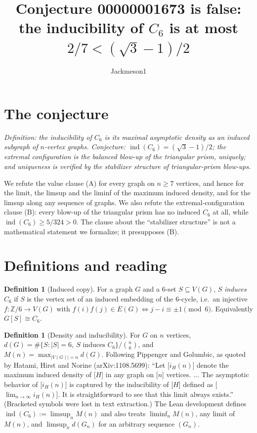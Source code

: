\documentclass[11pt]{article}
\title{Conjecture 00000001673 is false:\\ the inducibility of $C_6$ is at most $2/7 < (\sqrt3-1)/2$}
\author{Jackmeson1}
\date{}
\theoremstyle{definition}
\newtheorem{definition}[theorem]{Definition}
\newcommand{\ind}{\operatorname{ind}}
\begin{document}
\maketitle

\section*{The conjecture}
\emph{Definition: the inducibility of $C_6$ is its maximal asymptotic density as an induced subgraph
of $n$-vertex graphs. Conjecture: $\ind(C_6) = (\sqrt3-1)/2$; the extremal configuration is the
balanced blow-up of the triangular prism, uniquely; and uniqueness is verified by the stabilizer
structure of triangular-prism blow-ups.}

We refute the value clause (A) for every graph on $n \ge 7$ vertices, and hence for the limit,
the limsup and the liminf of the maximum induced density, and for the limsup along any sequence of
graphs. We also refute the extremal-configuration clause (B): every blow-up of the triangular prism
has no induced $C_6$ at all, while $\ind(C_6) \ge 5/324 > 0$. The clause about the ``stabilizer
structure'' is not a mathematical statement we formalize; it presupposes (B).

\section*{Definitions and reading}
\begin{definition}[Induced copy]
For a graph $G$ and a $6$-set $S \subseteq V(G)$, $S$ \emph{induces} $C_6$ if $S$ is the vertex set
of an induced embedding of the $6$-cycle, i.e.\ an injective $f\colon \mathbb{Z}/6 \to V(G)$ with
$f(i)f(j) \in E(G) \iff j-i \equiv \pm 1 \pmod 6$. Equivalently $G[S] \cong C_6$.
\end{definition}

\begin{definition}[Density and inducibility]
For $G$ on $n$ vertices, $d(G) = \#\{S : |S|=6,\ S \text{ induces } C_6\} / \binom{n}{6}$, and
$M(n) = \max_{|V(G)|=n} d(G)$. Following Pippenger and Golumbic, as quoted by Hatami, Hirst and Norine
(arXiv:1108.5699): ``Let [$i_H(n)$] denote the maximum induced density of [$H$] in any graph on
[$n$] vertices. ... The asymptotic behavior of [$i_H(n)$] is captured by the inducibility of [$H$]
defined as [$\lim_{n\to\infty} i_H(n)$]. It is straightforward to see that this limit always
exists.'' (Bracketed symbols were lost in text extraction.) The Lean development defines
$\ind(C_6) := \limsup_{n} M(n)$ and also treats $\liminf_n M(n)$, any limit of $M(n)$, and
$\limsup_n d(G_n)$ for an arbitrary sequence $(G_n)$.
\end{definition}
\end{document}
